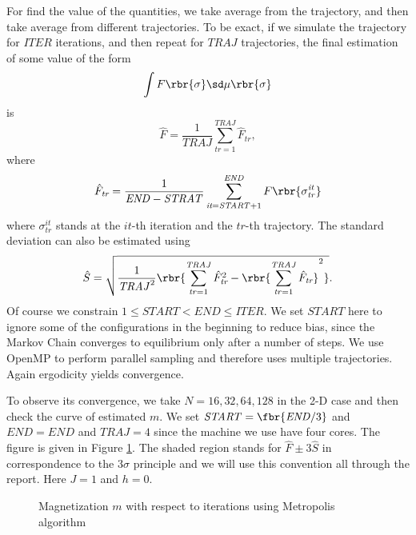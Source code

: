 \documentclass[english, nochinese]{pnote}
\begin{document}
For find the value of the quantities, we take average from the trajectory, and then take average from different trajectories. To be exact, if we simulate the trajectory for $\mathit{ITER}$ iterations, and then repeat for $\mathit{TRAJ}$ trajectories, the final estimation of some value of the form
\begin{equation}
\int F \rbr{\sigma} \sd \mu \rbr{\sigma}
\end{equation}
is
\begin{equation} \label{Eq:Ave}
\hat{F} = \frac{1}{\mathit{TRAJ}} \sum_{ \textit{tr} = 1 }^{\mathit{TRAJ}} \hat{F}_{\textit{tr}},
\end{equation}
where
\begin{equation}
\hat{F}_{\textit{tr}} = \frac{1}{ \mathit{END} - \mathit{STRAT} } \sum_{ \textit{it} = \mathit{START} + 1 }^{\mathit{END}} F \rbr{\sigma_{\mathit{tr}}^{\mathit{it}}} 
\end{equation}
where $ \sigma_{\mathit{tr}}^{\mathit{it}} $ stands at the $\mathit{it}$-th iteration and the $\mathit{tr}$-th trajectory. The standard deviation can also be estimated using
\begin{equation}
\hat{S} = \sqrt{ \frac{1}{\mathit{TRAJ}^2} \rbr{ \sum_{ \mathit{tr} = 1 }^{\mathit{TRAJ}} \hat{F}_{\textit{tr}}^2 - \rbr{ \sum_{ \mathit{tr} = 1 }^{\mathit{TRAJ}} \hat{F}_{\textit{tr}} }^2 } }.
\end{equation}
Of course we constrain $ 1 \le \mathit{START} < \mathit{END} \le \mathit{ITER} $. We set $\mathit{START}$ here to ignore some of the configurations in the beginning to reduce bias, since the Markov Chain converges to equilibrium only after a number of steps. We use OpenMP to perform parallel sampling and therefore uses multiple trajectories. Again ergodicity yields convergence.

To observe its convergence, we take $ N = 16, 32, 64, 128 $ in the 2-D case and then check the curve of estimated $m$. We set $ \mathit{START} = \fbr{ \mathit{END} / 3 } $ and $ \mathit{END} = \mathit{END} $ and $ \mathit{TRAJ} = 4 $ since the machine we use have four cores. The figure is given in Figure \ref{Fig:Metro}. The shaded region stands for $ \hat{F} \pm 3 \hat{S} $ in correspondence to the $ 3 \sigma $ principle and we will use this convention all through the report. Here $ J = 1 $ and $ h = 0 $.

\begin{figure}[htbp]
\centering
\scalebox{0.725}{}
\caption{Magnetization $m$ with respect to iterations using Metropolis algorithm}
\label{Fig:Metro}
\end{figure}
\end{document}
